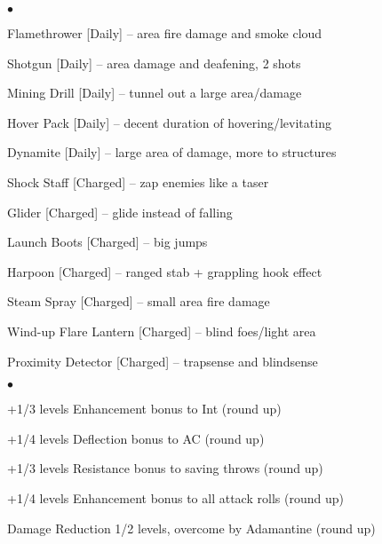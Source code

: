 \noindent{}


\begin{list}{$\bullet$}{\itemspace}
\item Flamethrower [Daily] -- area fire damage and smoke cloud
\item Shotgun [Daily] -- area damage and deafening, 2 shots
\item Mining Drill [Daily] -- tunnel out a large area/damage
\item Hover Pack [Daily] -- decent duration of hovering/levitating
\item Dynamite [Daily] -- large area of damage, more to structures
\item Shock Staff [Charged] -- zap enemies like a taser
\item Glider [Charged] -- glide instead of falling
\item Launch Boots [Charged] -- big jumps
\item Harpoon [Charged] -- ranged stab + grappling hook effect
\item Steam Spray [Charged] -- small area fire damage
\item Wind-up Flare Lantern [Charged] -- blind foes/light area
\item Proximity Detector [Charged] -- trapsense and blindsense
\end{list}



\begin{list}{$\bullet$}{\itemspace}
\item +1/3 levels Enhancement bonus to Int (round up)
\item +1/4 levels Deflection bonus to AC (round up)
\item +1/3 levels Resistance bonus to saving throws (round up)
\item +1/4 levels Enhancement bonus to all attack rolls (round up)
\item Damage Reduction 1/2 levels, overcome by Adamantine (round up)
\end{list}

